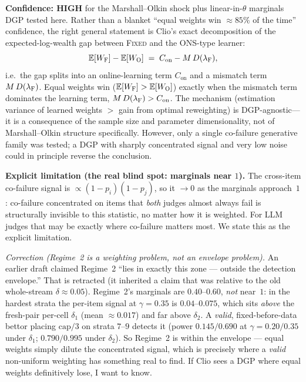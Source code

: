 \documentclass[11pt]{article}
\begin{document}
\textbf{Confidence: HIGH} for the Marshall--Olkin shock plus linear-in-$\theta$
marginals DGP tested here.
Rather than a blanket ``equal weights win $\approx 85\%$ of the time'' confidence,
the right general statement is Clio's exact decomposition of the expected-log-wealth
gap between \textsc{Fixed} and the ONS-type learner:
\begin{equation}
  \mathbb{E}[W_{\textsc{F}}] - \mathbb{E}[W_{\textsc{O}}]
    \;=\; C_{\mathrm{on}} - M\, D(\lambda_{\textsc{F}}),
  \label{eq:decomp}
\end{equation}
i.e.\ the gap splits into an online-learning term $C_{\mathrm{on}}$ and a mismatch
term $M\, D(\lambda_{\textsc{F}})$. Equal weights win ($\mathbb{E}[W_{\textsc{F}}]
> \mathbb{E}[W_{\textsc{O}}]$) exactly when the mismatch term dominates the learning
term, $M\, D(\lambda_{\textsc{F}}) > C_{\mathrm{on}}$.
The mechanism (estimation variance of learned weights $>$ gain from optimal reweighting)
is DGP-agnostic---it is a consequence of the sample size and parameter dimensionality,
not of Marshall--Olkin structure specifically.
However, only a single co-failure generative family was tested; a DGP with sharply
concentrated signal and very low noise could in principle reverse the conclusion.

\textbf{Explicit limitation (the real blind spot: marginals near $1$).}
The cross-item co-failure signal is $\propto (1-p_i)(1-p_j)$, so it $\to 0$ as the marginals
approach~$1$: co-failure concentrated on items that \emph{both} judges almost always fail is
structurally invisible to this statistic, no matter how it is weighted. For LLM judges that
may be exactly where co-failure matters most. We state this as the explicit limitation.

\emph{Correction (Regime~2 is a weighting problem, not an envelope problem).} An earlier
draft claimed Regime~2 ``lies in exactly this zone --- outside the detection envelope.''
That is retracted (it inherited a claim that was relative to the old whole-stream
$\delta\approx 0.05$). Regime~2's marginals are $0.40$--$0.60$, \emph{not} near~$1$: in the
hardest strata the per-item signal at $\gamma=0.35$ is $0.04$--$0.075$, which sits
\emph{above} the fresh-pair per-cell $\delta_1$ (mean $\approx 0.017$) and far above
$\delta_2$. A \emph{valid}, fixed-before-data bettor placing $\mathrm{cap}/3$ on strata
$7$--$9$ detects it (power $0.145/0.690$ at $\gamma=0.20/0.35$ under $\delta_1$;
$0.790/0.995$ under $\delta_2$). So Regime~2 is within the envelope --- equal weights simply
dilute the concentrated signal, which is precisely where a \emph{valid} non-uniform weighting
has something real to find.
If Clio sees a DGP where equal weights definitively lose, I want to know.
\end{document}
